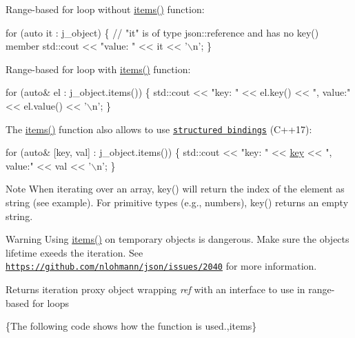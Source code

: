 Range-\/based for loop without {\ttfamily \hyperlink{classnlohmann_1_1basic__json_a916a6ba75ec7624e9c6c977a52d6fd17}{items()}} function\+:


\begin{DoxyCode}
\textcolor{keywordflow}{for} (\textcolor{keyword}{auto} it : j\_object)
\{
    \textcolor{comment}{// "it" is of type json::reference and has no key() member}
    std::cout << \textcolor{stringliteral}{"value: "} << it << \textcolor{charliteral}{'\(\backslash\)n'};
\}
\end{DoxyCode}


Range-\/based for loop with {\ttfamily \hyperlink{classnlohmann_1_1basic__json_a916a6ba75ec7624e9c6c977a52d6fd17}{items()}} function\+:


\begin{DoxyCode}
\textcolor{keywordflow}{for} (\textcolor{keyword}{auto}& el : j\_object.items())
\{
    std::cout << \textcolor{stringliteral}{"key: "} << el.key() << \textcolor{stringliteral}{", value:"} << el.value() << \textcolor{charliteral}{'\(\backslash\)n'};
\}
\end{DoxyCode}


The {\ttfamily \hyperlink{classnlohmann_1_1basic__json_a916a6ba75ec7624e9c6c977a52d6fd17}{items()}} function also allows to use \href{https://en.cppreference.com/w/cpp/language/structured_binding}{\tt structured bindings} (C++17)\+:


\begin{DoxyCode}
\textcolor{keywordflow}{for} (\textcolor{keyword}{auto}& [key, val] : j\_object.items())
\{
    std::cout << \textcolor{stringliteral}{"key: "} << \hyperlink{namespacenlohmann_1_1detail_a2fb6dae6578e06ae73ca0d7cc8512b1aa3c6e0b8a9c15224a8228b9a98ca1531d}{key} << \textcolor{stringliteral}{", value:"} << val << \textcolor{charliteral}{'\(\backslash\)n'};
\}
\end{DoxyCode}


\begin{DoxyNote}{Note}
When iterating over an array, {\ttfamily key()} will return the index of the element as string (see example). For primitive types (e.\+g., numbers), {\ttfamily key()} returns an empty string.
\end{DoxyNote}
\begin{DoxyWarning}{Warning}
Using {\ttfamily \hyperlink{classnlohmann_1_1basic__json_a916a6ba75ec7624e9c6c977a52d6fd17}{items()}} on temporary objects is dangerous. Make sure the object\textquotesingle{}s lifetime exeeds the iteration. See \href{https://github.com/nlohmann/json/issues/2040}{\tt https\+://github.\+com/nlohmann/json/issues/2040} for more information.
\end{DoxyWarning}
\begin{DoxyReturn}{Returns}
iteration proxy object wrapping {\itshape ref} with an interface to use in range-\/based for loops
\end{DoxyReturn}
\{The following code shows how the function is used.,items\}

